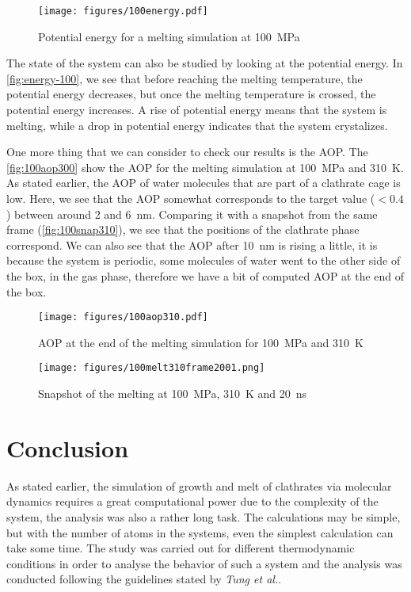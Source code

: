 \begin{figure}[htbp]
    \centering
    \texttt{[image: figures/100energy.pdf]}
    \caption{Potential energy for a melting simulation at \SI{100}{\mega\pascal}}
    \label{fig:energy-100}
\end{figure}

The state of the system can also be studied by looking at the potential energy. In \autoref{fig:energy-100}, we see that before reaching the melting temperature, the potential energy decreases, but once the melting temperature is crossed, the potential energy increases. A rise of potential energy means that the system is melting, while a drop in potential energy indicates that the system crystalizes.

One more thing that we can consider to check our results is the AOP. The \autoref{fig:100aop300} show the AOP for the melting simulation at \SI{100}{\mega\pascal} and \SI{310}{\kelvin}. As stated earlier, the AOP of water molecules that are part of a clathrate cage is low. Here, we see that the AOP somewhat corresponds to the target value ($< 0.4$) between around 2 and \SI{6}{\nano\meter}. Comparing it with a snapshot from the same frame (\autoref{fig:100snap310}), we see that the positions of the clathrate phase correspond. We can also see that the AOP after \SI{10}{\nano\meter} is rising a little, it is because the system is periodic, some molecules of water went to the other side of the box, in the gas phase, therefore we have a bit of computed AOP at the end of the box.

\begin{figure}[htbp]
    \centering
    \texttt{[image: figures/100aop310.pdf]}
    \caption{AOP at the end of the melting simulation for \SI{100}{\mega\pascal} and \SI{310}{\kelvin}}
    \label{fig:100aop300}
\end{figure}

\begin{figure}[htbp]
    \centering
    \texttt{[image: figures/100melt310frame2001.png]}
    \caption{Snapshot of the melting at \SI{100}{\mega\pascal}, \SI{310}{\kelvin} and \SI{20}{\nano\second}}
    \label{fig:100snap310}
\end{figure}

\section{Conclusion}
As stated earlier, the simulation of growth and melt of clathrates via molecular dynamics requires a great computational power due to the complexity of the system, the analysis was also a rather long task. The calculations may be simple, but with the number of atoms in the systems, even the simplest calculation can take some time. The study was carried out for different thermodynamic conditions in order to analyse the behavior of such a system and the analysis was conducted following the guidelines stated by \textit{Tung et al.}.

